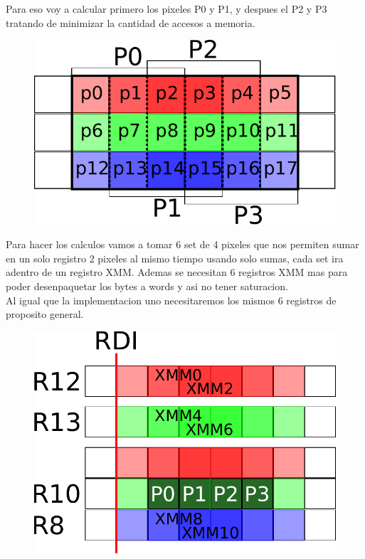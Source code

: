 Para eso voy a calcular primero los pixeles P0 y P1, y despues el P2 y P3 tratando de minimizar la cantidad de accesos a memoria. \\

\begin{figure}[h!]
	\centering
	\includegraphics[scale=0.5]{images/BlurASM2_1}
\end{figure}

Para hacer los calculos vamos a tomar 6 set de 4 pixeles que nos permiten sumar en un solo registro 2 pixeles al mismo tiempo usando solo sumas, cada set ira adentro de un registro XMM. Ademas se necesitan 6 registros XMM mas para poder desenpaquetar los bytes a words y asi no tener saturacion. \\

Al igual que la implementacion uno necesitaremos los mismos 6 registros de proposito general. \\

\begin{figure}[h!]
	\centering
	\includegraphics[scale=0.5]{images/BlurASM2_0}
\end{figure}


